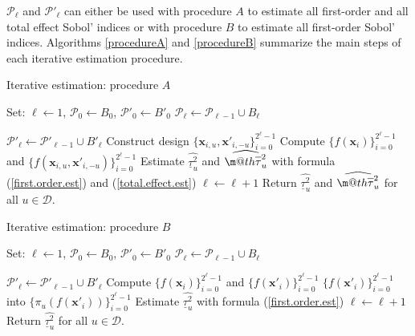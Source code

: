 \documentclass[]{elsarticle}
\makeatletter
\theoremstyle{definition}
\newcommand{\bvec}[1]{\boldsymbol{#1}}
\newcommand{\vx}{\bvec{x}}
\newcommand*{\ov}[1]{
  \m@th\overline{\mbox{#1}\raisebox{2mm}{}}
}
\makeatother
\begin{document}
$\mathcal{P}_{\ell}$ and $\mathcal{P}'_{\ell}$ can either be used with procedure $A$ to estimate all first-order and all total effect Sobol' indices or with procedure $B$ to estimate all first-order Sobol' indices. Algorithms \ref{procedureA} and \ref{procedureB} summarize the main steps of each iterative estimation procedure.
\begin{algorithm}[!ht]
\caption{Iterative estimation: procedure $A$}
\begin{algorithmic}[1]
\vspace*{0.2cm}
\State Set: $\ell \leftarrow 1$, $\mathcal{P}_{0} \leftarrow B_0$, ${\mathcal{P}'}_{0} \leftarrow {B'}_0$
\State $\mathcal{P}_\ell \leftarrow \mathcal{P}_{\ell-1} \cup B_\ell$

\hspace*{-0.3cm} $\mathcal{P}'_\ell \leftarrow \mathcal{P}'_{\ell-1} \cup {B'}_\ell$
\State Construct design $\{\vx_{i,u},{\vx'}_{i,-u}\}_{i=0}^{2^{\ell}-1}$
\State Compute $\{f(\vx_i)\}_{i=0}^{2^\ell-1}$ and $\{f(\vx_{i,u},{\vx'}_{i,-u})\}_{i=0}^{2^\ell-1}$
\State Estimate $\widehat{\underline{\tau}_u^2}$ and $\widehat{\ov{$\tau$}_u^2}$ with formula (\ref{first.order.est}) and (\ref{total.effect.est})
\EndFor
\State $\ell \leftarrow \ell + 1$
\EndWhile
\State Return $\widehat{\underline{\tau}_u^2}$ and $\widehat{\ov{$\tau$}_u^2}$ for all $u \in \mathcal{D}$.
\end{algorithmic}
\label{procedureA}
\end{algorithm}
\begin{algorithm}[!ht]
\caption{Iterative estimation: procedure $B$}
\begin{algorithmic}[1]
\vspace*{0.2cm}
\State Set: $\ell \leftarrow 1$, $\mathcal{P}_{0} \leftarrow B_0$, ${\mathcal{P}'}_{0} \leftarrow {B'}_0$
\State $\mathcal{P}_\ell \leftarrow \mathcal{P}_{\ell-1} \cup B_\ell$

\hspace*{-0.3cm} $\mathcal{P}'_\ell \leftarrow \mathcal{P}'_{\ell-1} \cup {B'}_\ell$
\State Compute $\{f(\vx_i)\}_{i=0}^{2^\ell-1}$ and $\{f({\vx'}_i)\}_{i=0}^{2^\ell-1}$
\State  $\{f({\vx'}_i)\}_{i=0}^{2^\ell-1}$ into $\{\pi_u(f({\vx'}_i))\}_{i=0}^{2^\ell-1}$
\State Estimate $\widehat{\underline{\tau}_u^2}$ with formula (\ref{first.order.est})
\EndFor
\State $\ell \leftarrow \ell + 1$
\EndWhile
\State Return $\widehat{\underline{\tau}_u^2}$ for all $u \in \mathcal{D}$.
\end{algorithmic}
\label{procedureB}
\end{algorithm}
\end{document}
